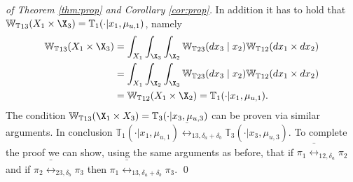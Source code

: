 \documentclass[letterpaper, 10 pt, conference]{amsart}
\theoremstyle{definition}
\theoremstyle{example}
\theoremstyle{remark}
\newcommand{\Wt}{\mathbb{W}_{\mathbb{T}}}
\begin{document}
\begin{proof}[of Theorem \ref{thm:prop} and Corollary \ref{cor:prop}]
In addition it has to hold that ${\Wt}_{13}(X_1\times \X_3)=\mathbb T_{1}(\cdot|x_1,\mu_{u,1})$, namely 
\begin{align*}
\mathbb {\Wt}_{13}(X_1\times \X_3)&=\int_{X_1} \int_{\X_3}\int_{\X_2}{\Wt}_{23}(dx_3\mid x_2) {\Wt}_{12}(dx_1\times dx_2)\\
&=\int_{X_1}\int_{\X_2} \int_{\X_3}{\Wt}_{23}(dx_3\mid x_2) {\Wt}_{12}(dx_1\times dx_2)\\&= {\Wt}_{12}(X_1\times \X_2)= \mathbb T_{1}(\cdot|x_1,\mu_{u,1}). 
\end{align*}
The condition ${\Wt}_{13}(\X_1\times X_3)=\mathbb T_{3}(\cdot|x_3,\mu_{u,3})
$ can be proven via similar arguments. In conclusion $\mathbb T_{1}(\cdot|x_1,\mu_{u,1})
\bar\rel_{13,\delta_a+\delta_b}\mathbb T_{3}(\cdot|x_3,\mu_{u,3})$.
To complete the proof we can show, using the same arguments as before,  that if $\pi_1\bar\rel_{12,\delta_a}\pi_2$ and if $\pi_2\bar\rel_{23,\delta_b}\pi_3$ then $\pi_1\bar\rel_{13,\delta_a+\delta_b}\pi_3$.
\qed
\end{proof}

 
\end{document}
